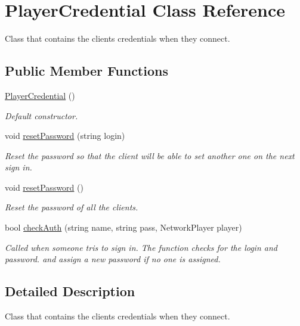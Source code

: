 \hypertarget{class_player_credential}{\section{Player\-Credential Class Reference}
\label{class_player_credential}
}


Class that contains the clients credentials when they connect. 


\subsection*{Public Member Functions}
\begin{DoxyCompactItemize}
\item 
\hyperlink{class_player_credential_aab07da93de00b47530acdabf38346827}{Player\-Credential} ()
\begin{DoxyCompactList}\small\item\em Default constructor.\end{DoxyCompactList}\item 
void \hyperlink{class_player_credential_a3bca7d76f6cc34a3f516e16e33cee73d}{reset\-Password} (string login)
\begin{DoxyCompactList}\small\item\em Reset the password so that the client will be able to set another one on the next sign in.\end{DoxyCompactList}\item 
void \hyperlink{class_player_credential_aca09696da22788f4263c2b28d8363fea}{reset\-Password} ()
\begin{DoxyCompactList}\small\item\em Reset the password of all the clients.\end{DoxyCompactList}\item 
bool \hyperlink{class_player_credential_a6b260a540ada32b6fcacf4f0162d42a7}{check\-Auth} (string name, string pass, Network\-Player player)
\begin{DoxyCompactList}\small\item\em Called when someone tris to sign in. The function checks for the login and password. and assign a new password if no one is assigned.\end{DoxyCompactList}\end{DoxyCompactItemize}


\subsection{Detailed Description}
Class that contains the clients credentials when they connect.



